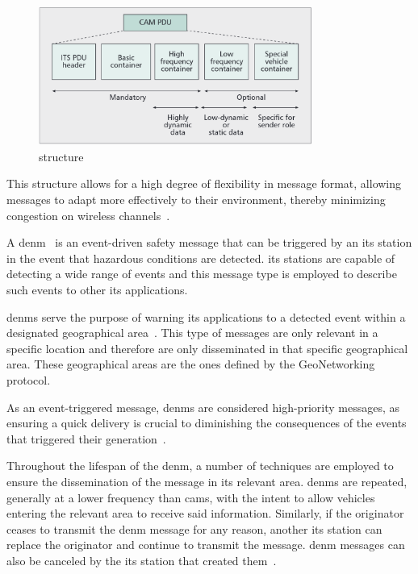 \begin{figure}[htbp]
    \centering
    \includegraphics[width=0.8\textwidth]{Chapters/Figures/VANETs/cam_structure.png}
   	\caption{ structure~\cite{festag_cooperative_2014}}
   	\label{fig:cam_structure}
\end{figure}

This structure allows for a high degree of flexibility in message format, allowing messages to adapt more effectively to their environment, thereby minimizing congestion on wireless channels~\cite{festag_cooperative_2014}.

A \gls{denm}~\cite{etsi_intelligent_2019-1} is an event-driven safety message that can be triggered by an \gls{its} station in the event that hazardous conditions are detected. \gls{its} stations are capable of detecting a wide range of events and this message type is employed to describe such events to other \gls{its} applications. 

\glspl{denm} serve the purpose of warning \gls{its} applications to a detected event within a designated geographical area~\cite{festag_cooperative_2014}. This type of messages are only relevant in a specific location and therefore are only disseminated in that specific geographical area. These geographical areas are the ones defined by the GeoNetworking protocol.

As an event-triggered message, \glspl{denm} are considered high-priority messages, as ensuring a quick delivery is crucial to diminishing the consequences of the events that triggered their generation~\cite{al-sultan_comprehensive_2014}.

Throughout the lifespan of the \gls{denm}, a number of techniques are employed to ensure the dissemination of the message in its relevant area. \glspl{denm} are repeated, generally at a lower frequency than \glspl{cam}, with the intent to allow vehicles entering the relevant area to receive said information. Similarly, if the originator ceases to transmit the \gls{denm} message for any reason, another \gls{its} station can replace the originator and continue to transmit the message. \gls{denm} messages can also be canceled by the \gls{its} station that created them~\cite{festag_cooperative_2014}.


